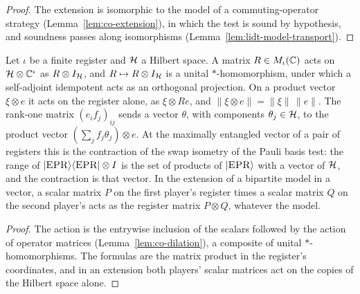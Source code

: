 \begin{proof}
\leanok
The extension is isomorphic to the model of a commuting-operator strategy
(Lemma~\ref{lem:co-extension}), in which the test is sound by hypothesis, and soundness passes along
isomorphisms (Lemma~\ref{lem:lidt-model-transport}).
\end{proof}

\begin{lemma}
\label{lem:register-action}
\leanok
Let $\iota$ be a finite register and $\mathcal{H}$ a Hilbert space. A matrix $R \in M_\iota(\mathbb{C})$ acts on
$\mathcal{H} \otimes \mathbb{C}^\iota$ as $R \otimes I_{\mathcal{H}}$, and $R \mapsto R \otimes I_{\mathcal{H}}$ is a unital
$*$-homomorphism, under which a self-adjoint idempotent acts as an orthogonal projection. On a
product vector $\xi \otimes e$ it acts on the register alone, as $\xi \otimes Re$, and $\|\xi
\otimes e\| = \|\xi\|\,\|e\|$. The rank-one matrix $(e_i f_j)_{ij}$ sends a vector $\theta$, with
components $\theta_j \in \mathcal{H}$, to the product vector $(\sum_j f_j \theta_j) \otimes e$. At the
maximally entangled vector of a pair of registers this is the contraction of the swap isometry of
the Pauli basis test: the range of $|\textsc{EPR}\rangle\langle\textsc{EPR}| \otimes I$ is the set of products of
$|\textsc{EPR}\rangle$ with a vector of $\mathcal{H}$, and the contraction is that vector. In the extension of a
bipartite model in a vector, a scalar matrix $P$ on the first player's register times a scalar
matrix $Q$ on the second player's acts as the register matrix $P \otimes Q$, whatever the model.
\end{lemma}

\begin{proof}
\leanok
The action is the entrywise inclusion of the scalars followed by the action of operator matrices
(Lemma~\ref{lem:co-dilation}), a composite of unital $*$-homomorphisms. The formulas are the matrix
product in the register's coordinates, and in an extension both players' scalar matrices act on the
copies of the Hilbert space alone.
\end{proof}

